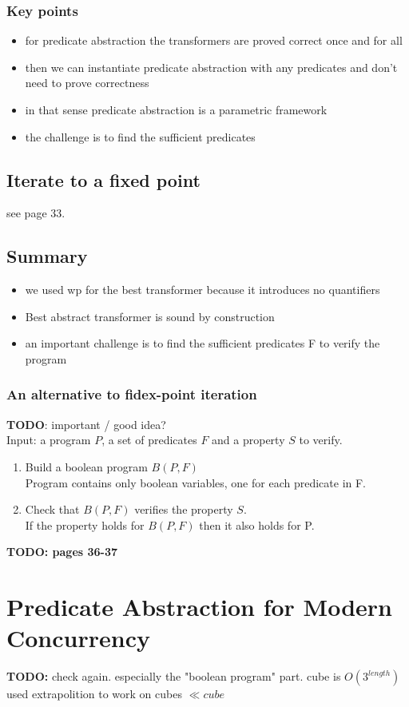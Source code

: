 \subsubsection{Key points}
\begin{itemize}
    \item for predicate abstraction the transformers are proved correct once and for all
    \item then we can instantiate predicate abstraction with any predicates and don't need to prove correctness
    \item in that sense predicate abstraction is a parametric framework
    \item the challenge is to find the sufficient predicates
\end{itemize}
\subsection{Iterate to a fixed point}
see page 33.
\subsection{Summary}
\begin{itemize}
    \item we used wp for the best transformer because it introduces no quantifiers
    \item Best abstract transformer is sound by construction
    \item an important challenge is to find the sufficient predicates F to verify the program
\end{itemize}
\subsubsection{An alternative to fidex-point iteration}
\textbf{TODO}: important / good idea?\\ 
Input: a program $P$, a set of predicates $F$ and a property $S$ to verify. 
\begin{enumerate}
    \item Build a boolean program $B(P,F)$\\
        Program contains only boolean variables, one for each predicate in F.
    \item Check that $B(P,F)$ verifies the property $S$. \\
        If the property holds for $B(P,F)$ then it also holds for P.
\end{enumerate}
\textbf{TODO: pages 36-37}
\section{Predicate Abstraction for Modern Concurrency}
\textbf{TODO: } check again. especially the "boolean program" part. 
cube is $O(3^{length})$ used extrapolition to work on cubes $\ll cube$ 
